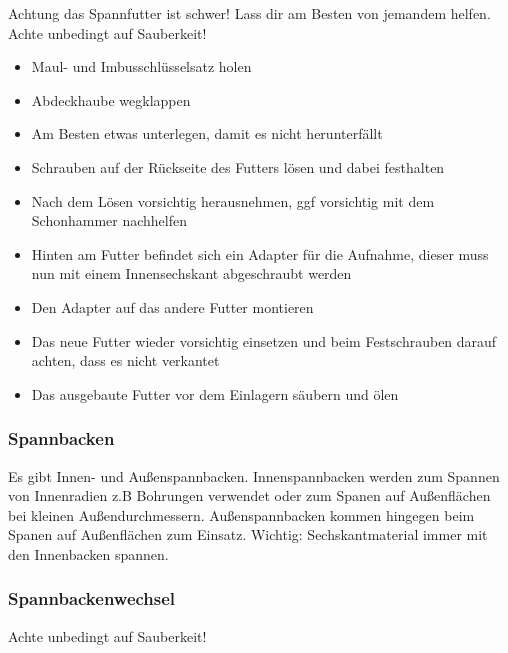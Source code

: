 \documentclass{\basedir/fablab-document}
\begin{document}
Achtung das Spannfutter ist schwer! Lass dir am Besten von jemandem helfen. Achte unbedingt auf Sauberkeit!
\begin{itemize}
\item Maul- und Imbusschlüsselsatz holen
\item Abdeckhaube wegklappen
\item Am Besten etwas unterlegen, damit es nicht herunterfällt
\item Schrauben auf der Rückseite des Futters lösen und dabei festhalten 
\item Nach dem Lösen vorsichtig herausnehmen, ggf vorsichtig mit dem Schonhammer nachhelfen
\item Hinten am Futter befindet sich ein Adapter für die Aufnahme, dieser muss nun mit einem Innensechskant abgeschraubt werden
\item Den Adapter auf das andere Futter montieren
\item Das neue Futter wieder vorsichtig einsetzen und beim Festschrauben darauf achten, dass es nicht verkantet
\item Das ausgebaute Futter vor dem Einlagern säubern und ölen
\end{itemize}

\subsubsection{Spannbacken}

Es gibt Innen- und Außenspannbacken. Innenspannbacken werden zum Spannen von Innenradien z.B Bohrungen verwendet oder zum Spanen auf Außenflächen bei kleinen Außendurchmessern. Außenspannbacken kommen hingegen beim Spanen auf Außenflächen zum Einsatz. Wichtig: Sechskantmaterial immer mit den Innenbacken spannen.


\subsubsection{Spannbackenwechsel}
Achte unbedingt auf Sauberkeit!
 
\end{document}
